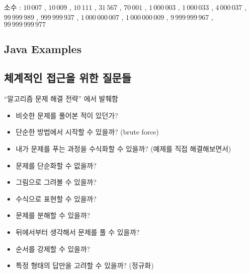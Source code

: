 \documentclass[10pt,landscape,a4paper,twocolumn]{article}
\begin{document}
소수 : $10\,007$ , $10\,009$ , $10\,111$ , $31\,567$ , $70\,001$ , $1\,000\,003$ , $1\,000\,033$ , $4\,000\,037$ , $99\,999\,989$ , $999\,999\,937$ , $1\,000\,000\,007$ , $1\,000\,000\,009$ , $9\,999\,999\,967$ , $99\,999\,999\,977$



\subsection{Java Examples}



\subsection{체계적인 접근을 위한 질문들}

``알고리즘 문제 해결 전략'' 에서 발췌함
\begin{itemize}
\item 비슷한 문제를 풀어본 적이 있던가?
\item 단순한 방법에서 시작할 수 있을까? (brute force)
\item 내가 문제를 푸는 과정을 수식화할 수 있을까? (예제를 직접 해결해보면서)
\item 문제를 단순화할 수 없을까?
\item 그림으로 그려볼 수 있을까?
\item 수식으로 표현할 수 있을까?
\item 문제를 분해할 수 있을까?
\item 뒤에서부터 생각해서 문제를 풀 수 있을까?
\item 순서를 강제할 수 있을까?
\item 특정 형태의 답만을 고려할 수 있을까? (정규화)
\end{itemize}
\end{document}
